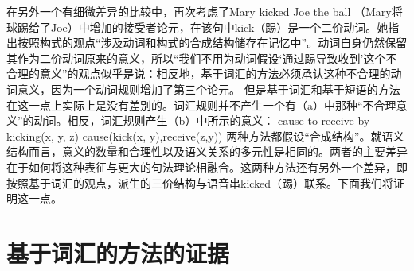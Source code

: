 \addlines[2]
    在另外一个有细微差异的比较中，\citet[--140]{Goldberg95a}再次考虑了Mary kicked Joe the ball （Mary将球踢给了Joe）中增加的接受者论元，在该句中kick（踢）是一个二价动词。她指出按照构式的观点“涉及动词和构式的合成结构储存在记忆中”。动词自身仍然保留其作为二价动词原来的意义，所以“我们不用为动词假设‘通过踢导致收到’这个不合理的意义”的观点似乎是说：相反地，基于词汇的方法必须承认这种不合理的动词意义，因为一个动词规则增加了第三个论元。
    但是基于词汇和基于短语的方法在这一点上实际上是没有差别的。词汇规则并不产生一个有（a）中那种“不合理意义”的动词。相反，词汇规则产生（b）中所示的意义：
\eal
\ex cause-to-receive-by-kicking(x, y, z) 
\ex cause(kick(x, y),receive(z,y))
\zl
两种方法都假设“合成结构”。就语义结构而言，意义的数量和合理性以及语义关系的多元性是相同的。两者的主要差异在于如何将这种表征与更大的句法理论相融合。这两种方法还有另外一个差异，即按照基于词汇的观点，派生的三价结构与语音串kicked（踢）联系。下面我们将证明这一点。
 
\section{基于词汇的方法的证据}

